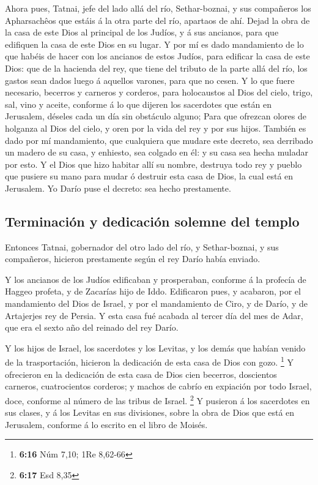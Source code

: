  Ahora pues, Tatnai, jefe del lado allá del río,
Sethar-boznai, y sus compañeros los Apharsachêos que estáis á la otra
parte del río, apartaos de ahí.  Dejad la obra de la casa
de este Dios al principal de los Judíos, y á sus ancianos, para que
edifiquen la casa de este Dios en su lugar.  Y por mí es
dado mandamiento de lo que habéis de hacer con los ancianos de estos
Judíos, para edificar la casa de este Dios: que de la hacienda del rey,
que tiene del tributo de la parte allá del río, los gastos sean dados
luego á aquellos varones, para que no cesen.  Y lo que
fuere necesario, becerros y carneros y corderos, para holocaustos al
Dios del cielo, trigo, sal, vino y aceite, conforme á lo que dijeren los
sacerdotes que están en Jerusalem, déseles cada un día sin obstáculo
alguno;  Para que ofrezcan olores de holganza al Dios del
cielo, y oren por la vida del rey y por sus hijos. 
También es dado por mí mandamiento, que cualquiera que mudare este
decreto, sea derribado un madero de su casa, y enhiesto, sea colgado en
él: y su casa sea hecha muladar por esto.  Y el Dios que
hizo habitar allí su nombre, destruya todo rey y pueblo que pusiere su
mano para mudar ó destruir esta casa de Dios, la cual está en Jerusalem.
Yo Darío puse el decreto: sea hecho prestamente.

\hypertarget{terminaciuxf3n-y-dedicaciuxf3n-solemne-del-templo}{%
\subsection{Terminación y dedicación solemne del
templo}\label{terminaciuxf3n-y-dedicaciuxf3n-solemne-del-templo}}

 Entonces Tatnai, gobernador del otro lado del río, y
Sethar-boznai, y sus compañeros, hicieron prestamente según el rey Darío
había enviado.

 Y los ancianos de los Judíos edificaban y prosperaban,
conforme á la profecía de Haggeo profeta, y de Zacarías hijo de Iddo.
Edificaron pues, y acabaron, por el mandamiento del Dios de Israel, y
por el mandamiento de Ciro, y de Darío, y de Artajerjes rey de Persia.
 Y esta casa fué acabada al tercer día del mes de Adar,
que era el sexto año del reinado del rey Darío.

 Y los hijos de Israel, los sacerdotes y los Levitas, y
los demás que habían venido de la trasportación, hicieron la dedicación
de esta casa de Dios con gozo. \footnote{\textbf{6:16} Núm 7,10; 1Re
  8,62-66}  Y ofrecieron en la dedicación de esta casa de
Dios cien becerros, doscientos carneros, cuatrocientos corderos; y
machos de cabrío en expiación por todo Israel, doce, conforme al número
de las tribus de Israel. \footnote{\textbf{6:17} Esd 8,35}
 Y pusieron á los sacerdotes en sus clases, y á los
Levitas en sus divisiones, sobre la obra de Dios que está en Jerusalem,
conforme á lo escrito en el libro de Moisés.

